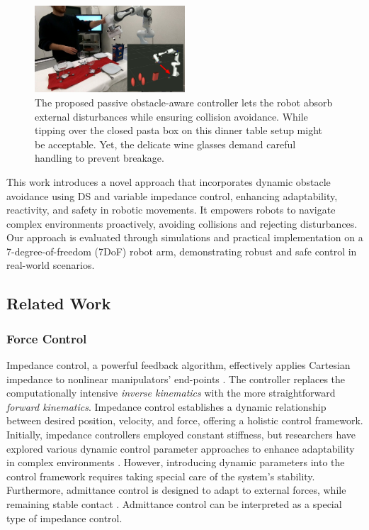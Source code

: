 \begin{figure}
\centerline{\includegraphics[width=0.5\textwidth]{figures/robot_arm_table_avoidance}}
\caption{
The proposed passive obstacle-aware controller lets the robot absorb external disturbances while ensuring collision avoidance. 
While tipping over the closed pasta box on this dinner table setup might be acceptable. Yet, the delicate wine glasses demand careful handling to prevent breakage.
}
\label{fig:table_avoidance_with_obstacle}
\end{figure}

This work introduces a novel approach that incorporates dynamic obstacle avoidance using DS and variable impedance control, enhancing adaptability, reactivity, and safety in robotic movements. It empowers robots to navigate complex environments proactively, avoiding collisions and rejecting disturbances. Our approach is evaluated through simulations and practical implementation on a 7-degree-of-freedom (7DoF) robot arm, demonstrating robust and safe control in real-world scenarios.


\subsection{Related Work}

\subsubsection{Force Control}
Impedance control, a powerful feedback algorithm, effectively applies Cartesian impedance to nonlinear manipulators' end-points \parencite{takegaki1981new, hogan1985impedance}. The controller replaces the computationally intensive \textit{inverse kinematics} with the more straightforward \textit{forward kinematics}. Impedance control establishes a dynamic relationship between desired position, velocity, and force, offering a holistic control framework.
Initially, impedance controllers employed constant stiffness, but researchers have explored various dynamic control parameter approaches to enhance adaptability in complex environments \parencite{vanderborght2013variable, abu2020variable}. However, introducing dynamic parameters into the control framework requires taking special care of the system's stability.
Furthermore, admittance control is designed to adapt to external forces, while remaining stable contact \parencite{glosser1994implementation}. Admittance control can be interpreted as a special type of impedance control.

